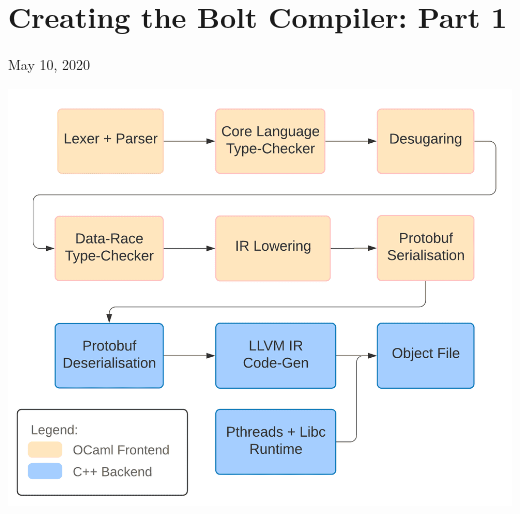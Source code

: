 %
%
%
%
%

\hypertarget{creating-the-bolt-compiler-part-1}{%
\chapter{Creating the Bolt Compiler: Part
1}\label{creating-the-bolt-compiler-part-1}}


May 10, 2020 


\includegraphics[width=\linewidth]{How I wrote my own proper programming language_files/compiler-pipeline.png}

